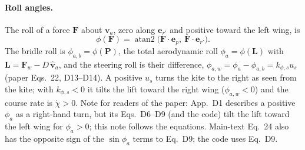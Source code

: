 \documentclass[11pt,a4paper]{article}
\begin{document}
\paragraph{Roll angles.} The roll of a force $\mathbf F$ about
$\mathbf v_a$, zero along $\mathbf e_{r'}$ and positive toward the left wing,
is
\begin{equation}
  \phi(\mathbf F)=\operatorname{atan2}\bigl(\mathbf F\cdot\mathbf e_p,\ \mathbf F\cdot\mathbf e_{r'}\bigr).
  \label{eq:roll}
\end{equation}
The bridle roll is $\phi_{a,b}=\phi(\mathbf P)$, the total aerodynamic roll
$\phi_a=\phi(\mathbf L)$ with $\mathbf L=\mathbf F_w-D\,\hat{\mathbf v}_a$,
and the steering roll is their difference,
$\phi_{a,w}=\phi_a-\phi_{a,b}=k_{\phi,s}u_s$ (paper Eqs.~22, D13--D14). A
positive $u_s$ turns the kite to the right as seen from the kite; with
$k_{\phi,s}<0$ it tilts the lift toward the right wing ($\phi_{a,w}<0$) and
the course rate is $\dot\chi>0$. Note for readers of the paper: App.~D1
describes a positive $\phi_a$ as a right-hand turn, but its Eqs.~D6--D9 (and
the code) tilt the lift toward the left wing for $\phi_a>0$; this note
follows the equations. Main-text Eq.~24 also has the opposite sign of the
$\sin\phi_a$ terms to Eq.~D9; the code uses Eq.~D9.
\end{document}
